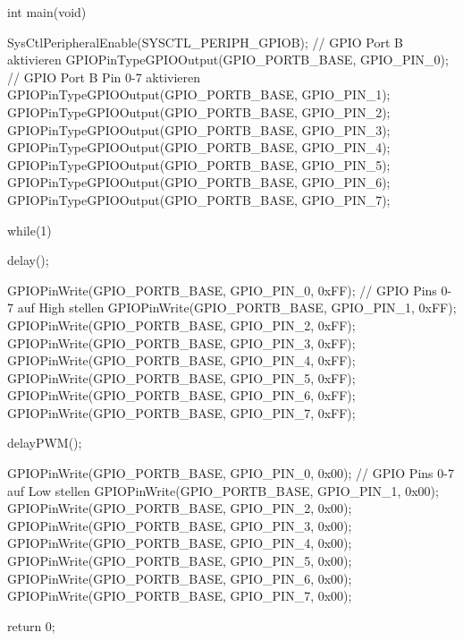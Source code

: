 int main(void){
    SysCtlPeripheralEnable(SYSCTL_PERIPH_GPIOB);                // GPIO Port B aktivieren
    GPIOPinTypeGPIOOutput(GPIO_PORTB_BASE, GPIO_PIN_0);         // GPIO Port B Pin 0-7 aktivieren
    GPIOPinTypeGPIOOutput(GPIO_PORTB_BASE, GPIO_PIN_1);
    GPIOPinTypeGPIOOutput(GPIO_PORTB_BASE, GPIO_PIN_2);
    GPIOPinTypeGPIOOutput(GPIO_PORTB_BASE, GPIO_PIN_3);
    GPIOPinTypeGPIOOutput(GPIO_PORTB_BASE, GPIO_PIN_4);
    GPIOPinTypeGPIOOutput(GPIO_PORTB_BASE, GPIO_PIN_5);
    GPIOPinTypeGPIOOutput(GPIO_PORTB_BASE, GPIO_PIN_6);
    GPIOPinTypeGPIOOutput(GPIO_PORTB_BASE, GPIO_PIN_7);

   while(1)
   {
       delay();
       
    GPIOPinWrite(GPIO_PORTB_BASE, GPIO_PIN_0, 0xFF);            // GPIO Pins 0-7 auf High stellen
    GPIOPinWrite(GPIO_PORTB_BASE, GPIO_PIN_1, 0xFF);
    GPIOPinWrite(GPIO_PORTB_BASE, GPIO_PIN_2, 0xFF);
    GPIOPinWrite(GPIO_PORTB_BASE, GPIO_PIN_3, 0xFF);
    GPIOPinWrite(GPIO_PORTB_BASE, GPIO_PIN_4, 0xFF);
    GPIOPinWrite(GPIO_PORTB_BASE, GPIO_PIN_5, 0xFF);
    GPIOPinWrite(GPIO_PORTB_BASE, GPIO_PIN_6, 0xFF);
    GPIOPinWrite(GPIO_PORTB_BASE, GPIO_PIN_7, 0xFF);
    
        delayPWM();
        
    GPIOPinWrite(GPIO_PORTB_BASE, GPIO_PIN_0, 0x00);            // GPIO Pins 0-7 auf Low stellen
    GPIOPinWrite(GPIO_PORTB_BASE, GPIO_PIN_1, 0x00);
    GPIOPinWrite(GPIO_PORTB_BASE, GPIO_PIN_2, 0x00);
    GPIOPinWrite(GPIO_PORTB_BASE, GPIO_PIN_3, 0x00);
    GPIOPinWrite(GPIO_PORTB_BASE, GPIO_PIN_4, 0x00);
    GPIOPinWrite(GPIO_PORTB_BASE, GPIO_PIN_5, 0x00);
    GPIOPinWrite(GPIO_PORTB_BASE, GPIO_PIN_6, 0x00);
    GPIOPinWrite(GPIO_PORTB_BASE, GPIO_PIN_7, 0x00);

   }
    return 0;
}

